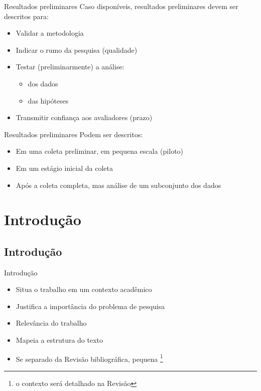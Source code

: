 \documentclass{beamer}
\begin{document}
\begin{frame}{Resultados preliminares}
  Caso disponíveis, resultados preliminares devem ser descritos para:
  \begin{itemize}
  \item Validar a metodologia
  \item Indicar o rumo da pesquisa (qualidade)
  \item Testar (preliminarmente) a análise:
    \begin{itemize}
    \item dos dados
    \item das hipóteses
    \end{itemize}
  \item Transmitir confiança aos avaliadores (prazo)
  \end{itemize}
\end{frame}

\begin{frame}{Resultados preliminares}
  Podem ser descritos:
  \begin{itemize}
  \item Em uma coleta preliminar, em pequena escala (piloto)
  \item Em um estágio inicial da coleta
  \item Após a coleta completa, mas análise de um subconjunto dos dados
  \end{itemize}
\end{frame}

\section{Introdução}

\subsection{Introdução}

\begin{frame}{Introdução}
  \begin{itemize}
  \item Situa o trabalho em um contexto acadêmico
  \item Justifica a importância do problema de pesquisa
  \item Relevância do trabalho
  \item Mapeia a estrutura do texto
  \item Se separado da Revisão bibliográfica, pequena \footnote{o
      contexto será detalhado na Revisão}
  \end{itemize}
\end{frame}
\end{document}

